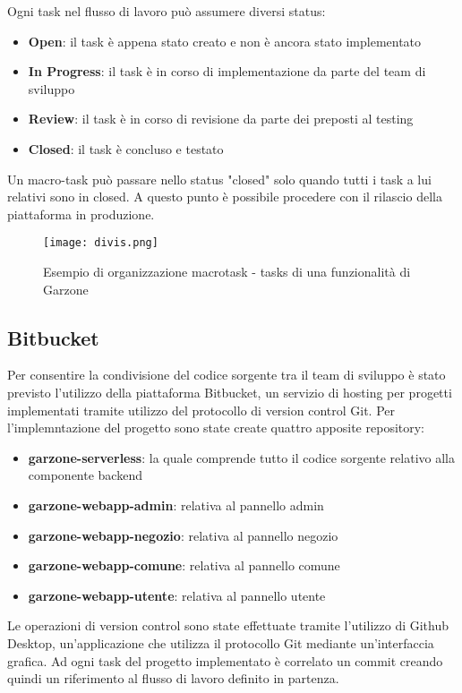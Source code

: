 Ogni task nel flusso di lavoro può assumere diversi status:
\begin{itemize}
    \item \textbf{Open}: il task è appena stato creato e non è ancora stato implementato
    \item \textbf{In Progress}: il task è in corso di implementazione da parte del team di sviluppo
    \item \textbf{Review}: il task è in corso di revisione da parte dei preposti al testing
    \item \textbf{Closed}: il task è concluso e testato
\end{itemize} 
Un macro-task può passare nello status "closed" solo quando tutti i task a lui relativi sono in closed. A questo punto è possibile procedere con il rilascio della piattaforma in produzione.
\begin{figure}[!htb]
    \centering
    \texttt{[image: divis.png]}
    \caption{Esempio di organizzazione macrotask - tasks di una funzionalità di Garzone}
\end{figure}
\subsection{Bitbucket}
Per consentire la condivisione del codice sorgente tra il team di sviluppo è stato previsto l'utilizzo della piattaforma Bitbucket, un servizio di hosting per progetti implementati tramite utilizzo del protocollo di version control Git. Per l'implemntazione del progetto sono state create quattro apposite repository:
\begin{itemize}
    \item \textbf{garzone-serverless}: la quale comprende tutto il codice sorgente relativo alla componente backend
    \item \textbf{garzone-webapp-admin}: relativa al pannello admin
    \item \textbf{garzone-webapp-negozio}: relativa al pannello negozio
    \item \textbf{garzone-webapp-comune}: relativa al pannello comune
    \item \textbf{garzone-webapp-utente}: relativa al pannello utente
\end{itemize}   
Le operazioni di version control sono state effettuate tramite l'utilizzo di Github Desktop, un'applicazione che utilizza il protocollo Git mediante un'interfaccia grafica. Ad ogni task del progetto implementato è correlato un commit creando quindi un riferimento al flusso di lavoro definito in partenza. 
